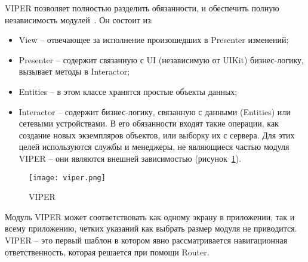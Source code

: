 VIPER позволяет полностью разделить обязанности, и обеспечить
полную независимость модулей~\cite{viper}. Он состоит из: 
\begin{itemize}
	\item View – отвечающее за исполнение произошедших в Presenter
	изменений;
	\item Presenter – содержит связанную с UI (независимую от UIKit)
	бизнес-логику, вызывает методы в Interactor;
	\item Entities – в этом классе хранятся простые объекты данных;
	\item Interactor – содержит бизнес-логику, связанную с данными
	(Entities) или сетевыми устройствами. В его обязанности входят такие
	операции, как создание новых экземпляров объектов, или выборку их с сервера.
	Для этих целей используются службы и менеджеры, не являющиеся частью
	модуля VIPER – они являются внешней зависимостью (рисунок~\ref{fig:analysis:viper}).
\end{itemize}

\begin{figure}[H]
	\centering
	\texttt{[image: viper.png]} 
	\caption{VIPER}
	\label{fig:analysis:viper}
\end{figure}

Модуль VIPER может соответствовать как одному экрану в
приложении, так и всему приложению, четких указаний как выбрать размер
модуля не приводится.
VIPER – это первый шаблон в котором явно рассматривается
навигационная ответственность, которая решается при помощи Router.





